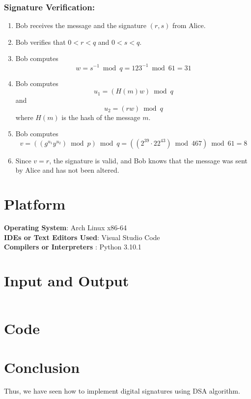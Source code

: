 \documentclass[11pt]{article}
\begin{document}
\subsubsection{Signature Verification:}

\begin{enumerate}
    \item Bob receives the message and the signature $(r, s)$ from Alice.
    \item Bob verifies that $0 < r < q$ and $0 < s < q$.
    \item Bob computes $$w = s^{-1} \bmod q = 123^{-1} \bmod 61 = 31$$
    \item Bob computes $$u_1 = (H(m)w) \bmod q$$ and $$u_2 = (rw) \bmod q$$where $H(m)$ is the hash of the message $m$.
    \item Bob computes $$v = ((g^{u_1} y^{u_2}) \bmod p) \bmod q = ((2^{39} \cdot 22^{43}) \bmod 467) \bmod 61 = 8$$
    \item Since $v = r$, the signature is valid, and Bob knows that the message was sent by Alice and has not been altered.
\end{enumerate}


\section{Platform}
\textbf{\textbf{Operating System}}: Arch Linux x86-64 \\
\textbf{\textbf{IDEs or Text Editors Used}}: Visual Studio Code\\
\textbf{\textbf{Compilers or Interpreters} }: Python 3.10.1\\

\section{Input and Output}

\begin{verbatim}

\end{verbatim}


\section{Code}


\section{Conclusion}
Thus, we have seen how to implement digital signatures using DSA algorithm.
\clearpage
\end{document}
